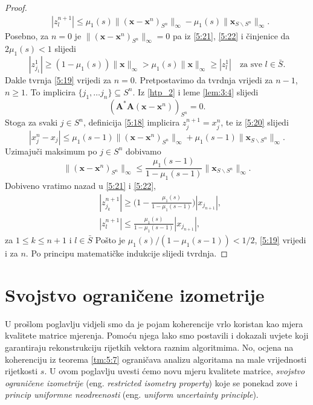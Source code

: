 \documentclass[a4paper,twoside,12pt]{memoir} %
\newcommand{\vect}[1]{\mathbf{#1}}
\renewcommand{\vec}{\vect}
\newcommand{\norm}[1]{\|{#1}\|}
\begin{document}
\begin{proof}
\begin{align}
        &|z_l^{n+1}| \leq \mu_1(s) \norm{(\vec x - \vec x^n)_{S^n}}_{\infty} - \mu_1(s)\norm{\vec x_{S \backslash S^n}}_{\infty}. \label{5:22}
    \end{align}
    Posebno, za $n = 0$ je $\norm{(\vec x - \vec x^n)_{S^n}}_{\infty} = 0$ pa iz \eqref{5:21}, \eqref{5:22} i \v{c}injenice da $2\mu_1(s) < 1$ slijedi
    \begin{equation*}
        |z_{j_1}^1| \geq (1-\mu_1(s))\norm{\vec x}_{\infty} > \mu_1(s) \norm{\vec x}_{\infty} \geq |z_l^1| \quad \text{za sve } l \in \bar S.
    \end{equation*}
    Dakle tvrnja \eqref{5:19} vrijedi za $n = 0$. Pretpostavimo da tvrdnja vrijedi za $n-1$, $n \geq 1$. To implicira $\{j_1, \dots j_n\} \subseteq S^n$. Iz \eqref{htp_2} i leme \ref{lem:3:4} slijedi
    \begin{equation*}
        (\vec A^* \vec A (\vec x - \vec x^n))_{S^n} = 0.
    \end{equation*}
    Stoga za svaki $j \in S^n$, definicija \eqref{5:18} implicira $z_j^{n+1} = x_j^n$, te iz \eqref{5:20} slijedi
    \begin{equation*}
        |x_j^n - x_j| \leq \mu_1(s-1) \norm{(\vec x - \vec x^n)_{S^n}}_{\infty} + \mu_1(s-1)\norm{\vec x_{S \backslash S^n}}_{\infty}.
    \end{equation*}
    Uzimaju\v{c}i maksimum po $j \in S^n$ dobivamo
    \begin{equation*}
        \norm{(\vec x - \vec x^n)_{S^n}}_{\infty}  \leq \frac{\mu_1(s-1)}{1 - \mu_1(s-1)} \norm{\vec x_{S \backslash S^n}}_{\infty}.
    \end{equation*}
    Dobiveno vratimo nazad u \eqref{5:21} i \eqref{5:22},
    \begin{align*}
        &|z_{j_k}^{n+1}|  \geq \big( 1 - \frac{\mu_1(s)}{1 - \mu_1(s-1)}\big) |x_{j_{n+1}}|,  \\
        &|z_{l}^{n+1}|  \leq \frac{\mu_1(s)}{1 - \mu_1(s-1)}|x_{j_{n+1}}|,
    \end{align*}
    za $1 \leq k \leq n+1$ i $l \in \bar S$
    Po\v{s}to je $\mu_1(s)/(1-\mu_1(s-1)) < 1/2$, \eqref{5:19} vrijedi i za $n$. Po principu matemati\v{c}ke indukcije slijedi tvrdnja.
\end{proof}

\chapter[Svojstvo ograni\v{c}ene izometrije][Svojstvo ograni\v{c}ene izometrije]{Svojstvo ograni\v{c}ene izometrije}
U pro\v{s}lom poglavlju vidjeli smo da je pojam koherencije vrlo koristan kao mjera kvalitete matrice mjerenja. Pomo\'cu njega lako smo postavili i dokazali uvjete koji garantiraju rekonstrukciju rijetkih vektora raznim algoritmima. No, ocjena na koherenciju iz teorema \eqref{tm:5:7} ograni\v{c}ava analizu algoritama na male vrijednosti rijetkosti $s$. U ovom poglavlju uvesti \'{c}emo novu mjeru kvalitete matrice, \textit{svojstvo ograni\v{c}ene izometrije} (eng. \textit{restricted isometry property}) koje se ponekad zove i \textit{princip uniformne neodre\dj enosti} (eng. \textit{uniform uncertainty principle}).
\end{document}
